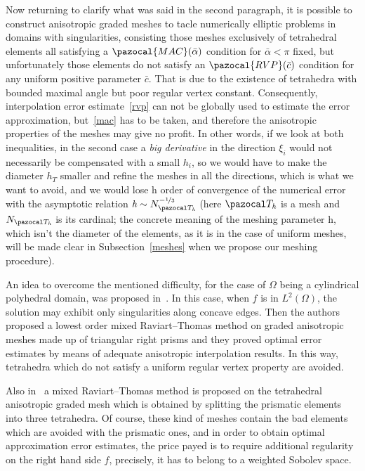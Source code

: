 Now returning to clarify what was said in the second paragraph, 
it is possible to construct anisotropic graded meshes to tacle numerically
elliptic problems in domains with singularities, consisting those meshes 
exclusively of tetrahedral elements all satisfying a $\pazocal{MAC}(\bar\alpha)$ condition for 
$\bar\alpha<\pi$ fixed, but unfortunately those 
elements do not satisfy an $\pazocal{RVP}(\bar c)$ condition for any uniform positive parameter
$\bar{c}$. That is 
due to the existence of tetrahedra with bounded 
maximal angle but poor regular vertex constant. Consequently, interpolation 
error estimate~\eqref{rvp} 
can not be globally used to estimate the error approximation, but~\eqref{mac} 
has to be taken, and therefore
the anisotropic properties of the meshes may give no profit. In other words, 
if we look at both inequalities, in the second case a \emph{big derivative} 
in the 
direction $\xi_i$ would not necessarily be 
compensated with a small $h_i$, so we would have to make the diameter
$h_T$ smaller and refine the meshes in all the directions, which is what we want
to avoid, and we would lose $\textit{h}$ order of convergence of the numerical error 
with the asymptotic relation 
$\textit{h}\sim N_{\Th}^{-\nicefrac13}$ (here $\Th$ is a mesh and $N_{\Th}$ is its
cardinal; the concrete meaning of the meshing parameter $\textit{h}$, 
which isn't the diameter of the elements, as it is in the case of uniform meshes, 
will
be made clear in Subsection~\ref{meshes} when we propose our meshing procedure).

\tetsTikz

An idea to overcome the mentioned difficulty, for the case of $\Omega$ being a 
cylindrical polyhedral domain, 
was proposed in~\cite{MR1866274}. In  this case, when $f$ is in $L^2(\Omega)$, 
the solution may exhibit only singularities along concave edges.
Then the authors proposed a lowest order mixed Raviart--Thomas method on graded 
anisotropic meshes made up of triangular right prisms and they proved optimal error 
estimates by means of adequate anisotropic interpolation results. 
In this way, tetrahedra which do not satisfy a
uniform regular vertex property are avoided.

Also in~\cite{MR1866274} a mixed Raviart--Thomas method is 
proposed on the tetrahedral 
anisotropic graded mesh which is obtained by splitting the prismatic elements 
into three tetrahedra. Of course, these kind of meshes contain the bad elements 
which are avoided with the prismatic ones, and in order to obtain optimal 
approximation error estimates, the price payed is to require additional regularity 
on the right hand side $f$, precisely, it has to belong to a weighted Sobolev space.

